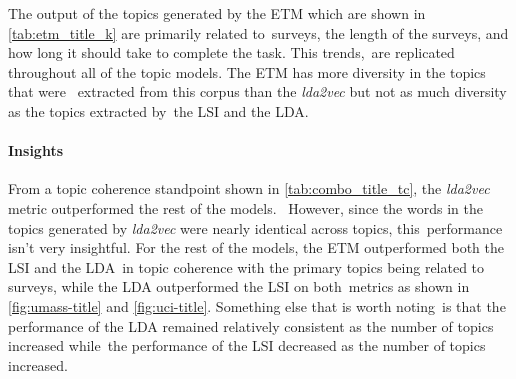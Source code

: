 \documentclass[letterpaper,12pt]{article}
\begin{document}
The output of the topics generated by the ETM which are shown in \ref{tab:etm_title_k} are primarily related to\
surveys, the length of the surveys, and how long it should take to complete the task. This trends,\
are replicated throughout all of the topic models. The ETM has more diversity in the topics that were \
extracted from this corpus than the \emph{lda2vec} but not as much diversity as the topics extracted by\
the LSI and the LDA.

\paragraph{Insights}
From a topic coherence standpoint shown in \ref{tab:combo_title_tc}, the \emph{lda2vec} metric outperformed the rest of the models. \
However, since the words in the topics generated by \emph{lda2vec} were nearly identical across topics, this\
performance isn't very insightful. For the rest of the models, the ETM outperformed both the LSI and the LDA\
in topic coherence with the primary topics being related to surveys, while the LDA outperformed the LSI on both\
metrics as shown in \ref{fig:umass-title} and \ref{fig:uci-title}. Something else that is worth noting\
is that the performance of the LDA remained relatively consistent as the number of topics increased while\
the performance of the LSI decreased as the number of topics increased.
\end{document}
